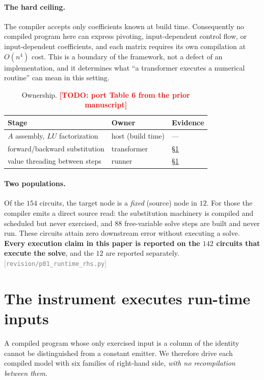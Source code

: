 \documentclass[11pt]{article}
\newcommand{\src}[1]{{\footnotesize\textcolor{gray}{[\texttt{#1}]}}}
\newcommand{\todo}[1]{\textcolor{red}{\textbf{[TODO: #1]}}}
\begin{document}
\paragraph{The hard ceiling.} The compiler accepts only coefficients known at
build time. Consequently no compiled program here can express pivoting,
input-dependent control flow, or input-dependent coefficients, and each matrix
requires its own compilation at $O(n^4)$ cost. This is a boundary of the
framework, not a defect of an implementation, and it determines what ``a
transformer executes a numerical routine'' can mean in this setting.

\begin{table}[t]
\centering
\caption{Ownership. \todo{port Table 6 from the prior manuscript}}
\label{tab:ownership}
\begin{tabular}{lll}
\toprule
Stage & Owner & Evidence \\
\midrule
$A$ assembly, $LU$ factorization & host (build time) & --- \\
forward/backward substitution & transformer & \S\ref{sec:runtime} \\
value threading between steps & runner & \S\ref{sec:runtime} \\
\bottomrule
\end{tabular}
\end{table}

\paragraph{Two populations.} Of the $154$ circuits, the target node is a
\emph{fixed} (source) node in $12$. For those the compiler emits a direct source
read: the substitution machinery is compiled and scheduled but never exercised,
and $88$ free-variable solve steps are built and never run. These circuits attain
zero downstream error without executing a solve. \textbf{Every execution claim in
this paper is reported on the $142$ circuits that execute the solve}, and the
$12$ are reported separately.
\src{revision/p01\_runtime\_rhs.py}

\section{The instrument executes run-time inputs}\label{sec:runtime}

A compiled program whose only exercised input is a column of the identity cannot
be distinguished from a constant emitter. We therefore drive each compiled model
with six families of right-hand side, \emph{with no recompilation between them}.
\end{document}
